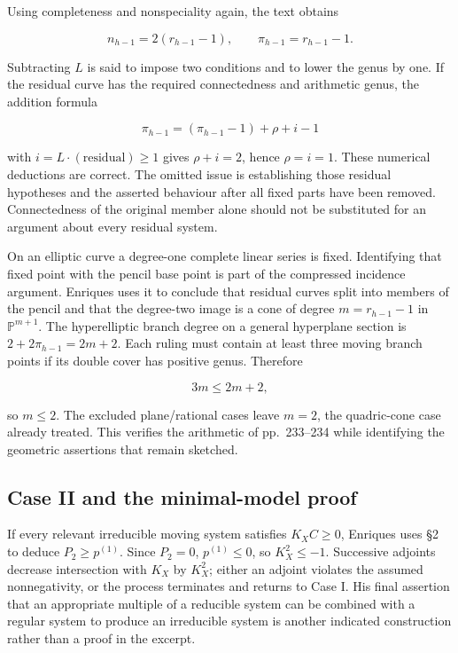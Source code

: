 Using completeness and nonspeciality again, the text obtains

\[
n_{h-1}=2(r_{h-1}-1),\qquad
\pi_{h-1}=r_{h-1}-1.
\]

Subtracting \(L\) is said to impose two conditions and to lower the genus by one. If the residual curve has the required connectedness and arithmetic genus, the addition formula

\[
\pi_{h-1}=(\pi_{h-1}-1)+\rho+i-1
\]

with \(i=L\cdot(\text{residual})\geq1\) gives \(\rho+i=2\), hence \(\rho=i=1\). These numerical deductions are correct. The omitted issue is establishing those residual hypotheses and the asserted behaviour after all fixed parts have been removed. Connectedness of the original member alone should not be substituted for an argument about every residual system.

On an elliptic curve a degree-one complete linear series is fixed. Identifying that fixed point with the pencil base point is part of the compressed incidence argument. Enriques uses it to conclude that residual curves split into members of the pencil and that the degree-two image is a cone of degree \(m=r_{h-1}-1\) in \(\mathbb P^{m+1}\). The hyperelliptic branch degree on a general hyperplane section is \(2+2\pi_{h-1}=2m+2\). Each ruling must contain at least three moving branch points if its double cover has positive genus. Therefore

\[
3m\leq2m+2,
\]

so \(m\leq2\). The excluded plane/rational cases leave \(m=2\), the quadric-cone case already treated. This verifies the arithmetic of pp.~233--234 while identifying the geometric assertions that remain sketched.

\subsection{Case II and the minimal-model proof}

If every relevant irreducible moving system satisfies \(K_X C\geq0\), Enriques uses §2 to deduce \(P_2\geq p^{(1)}\). Since \(P_2=0\), \(p^{(1)}\leq0\), so \(K_X^2\leq-1\). Successive adjoints decrease intersection with \(K_X\) by \(K_X^2\); either an adjoint violates the assumed nonnegativity, or the process terminates and returns to Case I. His final assertion that an appropriate multiple of a reducible system can be combined with a regular system to produce an irreducible system is another indicated construction rather than a proof in the excerpt.

